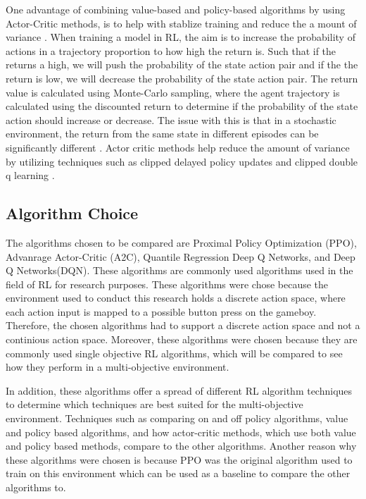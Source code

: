 
One advantage of combining value-based and policy-based algorithms by using Actor-Critic methods, is to help with stablize training and reduce the a mount of variance \cite{SergiosKaragiannakos2018}. When training a model in RL, the aim is to increase the probability of actions in a trajectory proportion to how high the return is. Such that if the returns a high, we will push the probability of the state action pair and if the the return is low, we will decrease the probability of the state action pair. The return value is calculated using Monte-Carlo sampling, where the agent trajectory is calculated using the discounted return to determine if the probability of the state action should increase or decrease. The issue with this is that in a stochastic environment, the return from the same state in different episodes can be significantly different \cite{ThomasSimonini2022A2C}. Actor critic methods help reduce the amount of variance by utilizing techniques such as clipped delayed policy updates and clipped double q learning \cite{padhye2023deep}.

\subsection{Algorithm Choice}

The algorithms chosen to be compared are Proximal Policy Optimization (PPO), Advanrage Actor-Critic (A2C), Quantile Regression Deep Q Networks, and Deep Q Networks(DQN). These algorithms are commonly used algorithms used in the field of RL for research purposes. These algorithms were chose because the environment used to conduct this research holds a discrete action space, where each action input is mapped to a possible button press on the gameboy. Therefore, the chosen algorithms had to support a discrete action space and not a continious action space. Moreover, these algorithms were chosen because they are commonly used single objective RL algorithms, which will be compared to see how they perform in a multi-objective environment.

In addition, these algorithms offer a spread of different RL algorithm techniques to determine which techniques are best suited for the multi-objective environment. Techniques such as comparing on and off policy algorithms, value and policy based algorithms, and how actor-critic methods, which use both value and policy based methods, compare to the other algorithms. Another reason why these algorithms were chosen is because PPO was the original algorithm used to train on this environment which can be used as a baseline to compare the other algorithms to. 

